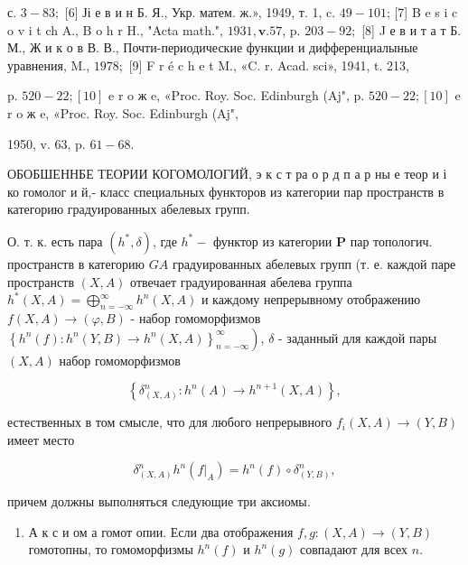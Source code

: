 \documentclass[10pt]{article}
\begin{document}
с. $3-83 ;$ [6] Јі е в и н Б. Я., Укр. матем. ж.», 1949, т. 1, c. $49-101$; [7] B e s i c o v i t ch A., B o h r H., "Acta math.", $1931, \mathbf{v} .57$, p. $203-92 ;$ [8] J е в и т а т Б. М., Ж и к о в В. В., Почти-периодические функции и дифференциалыные уравнения, M., $1978 ;$ [9] F r é c h e t M., «C. r. Acad. sci», 1941, t. 213,

p. $520-22 ;[10]$ e r o ж e, «Proc. Roy. Soc. Edinburgh (Aj", p. $520-22 ;[10]$ e r o ж e, «Proc. Roy. Soc. Edinburgh (Aj",

1950, v. 63, p. $61-68$.



ОБОБШЕННБЕ ТЕОРИИ КОГОМОЛОГИЙ, э к с т ра о р д п а р ны е теор и і ко гомолог и й,- класс специальных функторов из категории пар пространств в категорию градуированных абелевых групп.



О. т. к. есть пара $\left(h^{*}, \delta\right)$, где $h^{*}-$ функтор из категории $\boldsymbol{P}$ пар топологич. пространств в категорию $G A$ градуированных абелевых групп (т. е. каждой паре пространств $(X, A)$ отвечает градуированная абелева группа $h^{*}(X, A)=\bigoplus_{n=-\infty}^{\infty} h^{n}(X, A)$ и каждому непрерывному отображению $f(X, A) \rightarrow(\varphi, B)$ - набор гомоморфизмов $\left.\left\{h^{n}(f): h^{n}(Y, B) \rightarrow h^{n}(X, A)\right\}_{n=-\infty}^{\infty}\right)$, $\delta$ - заданный для каждой пары $(X, A)$ набор гомоморфизмов



\[

\left\{\delta_{(X, A)}^{n}: h^{n}(A) \rightarrow h^{n+1}(X, A)\right\},

\]



естественных в том смысле, что для любого непрерывного $f_{i}(X, A) \rightarrow(Y, B)$ имеет место



\[

\delta_{(X, A)}^{n} h^{n}\left(\left.f\right|_{A}\right)=h^{n}(f) \circ \delta_{(Y, B)}^{n},

\]



причем должны выполняться следующие три аксиомы.



\begin{enumerate}

  \item А к с и ом а гомот опии. Если два отображения $f, g:(X, A) \rightarrow(Y, B)$ гомотопны, то гомоморфизмы $h^{n}(f)$ и $h^{n}(g)$ совпадают для всех $n$.

\end{enumerate}
\end{document}
